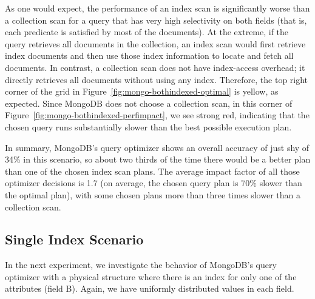 As one would expect, the performance of an index scan is significantly worse than a collection scan for a query that has very high selectivity on both fields (that is, each predicate is satisfied by most of the documents). At the extreme, if the query retrieves all documents in the collection, an index scan would first retrieve index documents and then use those index information to locate and fetch all documents. In contrast, a collection scan does not have index-access overhead; it directly retrieves all documents without using any index. Therefore, the top right corner of the grid in Figure~\ref{fig:mongo-bothindexed-optimal} is yellow, as expected. Since MongoDB does not choose a collection scan, in this corner of Figure~\ref{fig:mongo-bothindexed-perfimpact}, we see strong red, indicating that the chosen query runs substantially slower than the best possible execution plan.

In summary, MongoDB's \approachName query optimizer shows an overall accuracy of just shy of 34\%
in this scenario, so about two thirds of the time there would be a better plan than one of the chosen index scan plans. The average impact factor of all those optimizer decisions is 1.7 (on average, the chosen query plan is 70\% slower than the optimal plan), with some chosen plans more than three times slower than a collection scan.



\vspace*{-0.5\baselineskip}
\subsection{Single Index Scenario}
In the next experiment, we investigate the behavior of MongoDB's query optimizer with a physical structure where there is an index for only one of the attributes (field B). Again, we have uniformly distributed values in each field.

